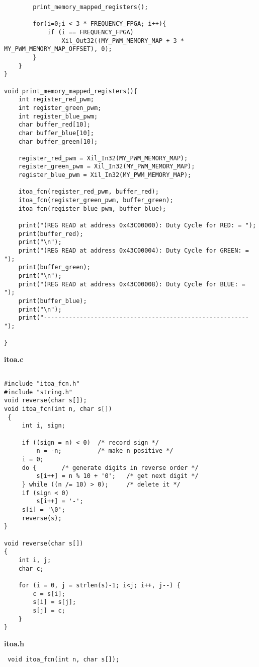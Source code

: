 \begin{verbatim}
        print_memory_mapped_registers();

        for(i=0;i < 3 * FREQUENCY_FPGA; i++){
            if (i == FREQUENCY_FPGA)
                Xil_Out32((MY_PWM_MEMORY_MAP + 3 * MY_PWM_MEMORY_MAP_OFFSET), 0);
        }
    }
}

void print_memory_mapped_registers(){
    int register_red_pwm;
    int register_green_pwm;
    int register_blue_pwm;
    char buffer_red[10];
    char buffer_blue[10];
    char buffer_green[10];

    register_red_pwm = Xil_In32(MY_PWM_MEMORY_MAP);
    register_green_pwm = Xil_In32(MY_PWM_MEMORY_MAP);
    register_blue_pwm = Xil_In32(MY_PWM_MEMORY_MAP);

    itoa_fcn(register_red_pwm, buffer_red);
    itoa_fcn(register_green_pwm, buffer_green);
    itoa_fcn(register_blue_pwm, buffer_blue);

    print("(REG READ at address 0x43C00000): Duty Cycle for RED: = ");
    print(buffer_red);
    print("\n");
    print("(REG READ at address 0x43C00004): Duty Cycle for GREEN: = ");
    print(buffer_green);
    print("\n");
    print("(REG READ at address 0x43C00008): Duty Cycle for BLUE: = ");
    print(buffer_blue);
    print("\n");
    print("---------------------------------------------------------");

}

\end{verbatim}



\textbf{itoa.c}
\begin{verbatim}

#include "itoa_fcn.h"
#include "string.h"
void reverse(char s[]);
void itoa_fcn(int n, char s[])
 {
     int i, sign;

     if ((sign = n) < 0)  /* record sign */
         n = -n;          /* make n positive */
     i = 0;
     do {       /* generate digits in reverse order */
         s[i++] = n % 10 + '0';   /* get next digit */
     } while ((n /= 10) > 0);     /* delete it */
     if (sign < 0)
         s[i++] = '-';
     s[i] = '\0';
     reverse(s);
}

void reverse(char s[])
{
    int i, j;
    char c;

    for (i = 0, j = strlen(s)-1; i<j; i++, j--) {
        c = s[i];
        s[i] = s[j];
        s[j] = c;
    }
}
\end{verbatim}

\textbf{itoa.h}
\begin{verbatim}
 void itoa_fcn(int n, char s[]);
\end{verbatim}
